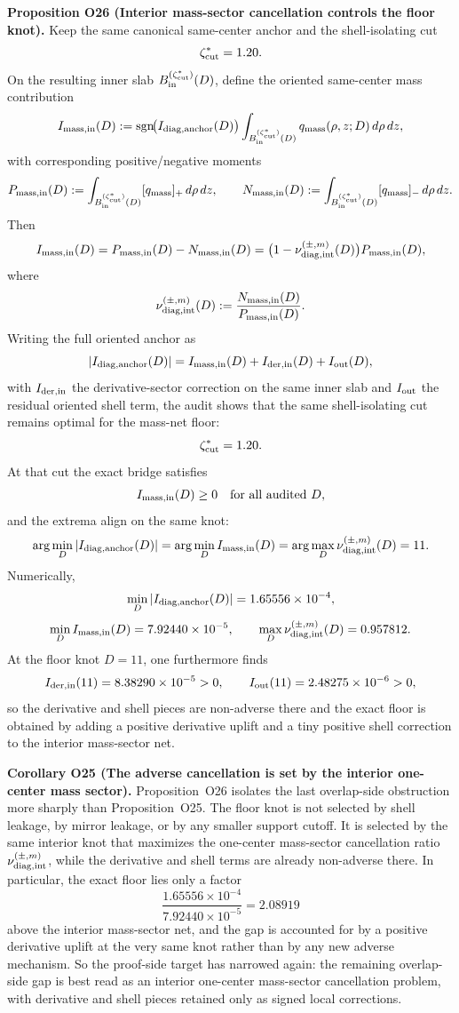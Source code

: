 \documentclass[aps,prd,onecolumn,notitlepage,nofootinbib,superscriptaddress,11pt,floatfix]{revtex4-2}
\begin{document}
\medskip\noindent\textbf{Proposition O26 (Interior mass-sector cancellation controls the floor knot).}
Keep the same canonical same-center anchor and the shell-isolating cut
\[
\zeta_{\rm cut}^{\ast}=1.20.
\]
On the resulting inner slab \(B_{\rm in}^{(\zeta_{\rm cut}^{\ast})}(D)\), define the oriented same-center mass contribution
\[
I_{\rm mass,in}(D)
:=
\operatorname{sgn}\!\bigl(I_{\rm diag,anchor}(D)\bigr)
\int_{B_{\rm in}^{(\zeta_{\rm cut}^{\ast})}(D)} q_{\rm mass}(\rho,z;D)\,d\rho\,dz,
\]
with corresponding positive/negative moments
\[
P_{\rm mass,in}(D):=\int_{B_{\rm in}^{(\zeta_{\rm cut}^{\ast})}(D)} [q_{\rm mass}]_+\,d\rho\,dz,
\qquad
N_{\rm mass,in}(D):=\int_{B_{\rm in}^{(\zeta_{\rm cut}^{\ast})}(D)} [q_{\rm mass}]_-\,d\rho\,dz.
\]
Then
\[
I_{\rm mass,in}(D)=P_{\rm mass,in}(D)-N_{\rm mass,in}(D)
=
\bigl(1-\nu_{\rm diag,int}^{(\pm,m)}(D)\bigr)P_{\rm mass,in}(D),
\]
where
\[
\nu_{\rm diag,int}^{(\pm,m)}(D)
:=
\frac{N_{\rm mass,in}(D)}{P_{\rm mass,in}(D)}.
\]
Writing the full oriented anchor as
\[
|I_{\rm diag,anchor}(D)|
=
I_{\rm mass,in}(D)+I_{\rm der,in}(D)+I_{\rm out}(D),
\]
with \(I_{\rm der,in}\) the derivative-sector correction on the same inner slab and \(I_{\rm out}\) the residual oriented shell term, the audit
shows that the same shell-isolating cut remains optimal for the mass-net floor:
\[
\zeta_{\rm cut}^{\ast}=1.20.
\]
At that cut the exact bridge satisfies
\[
I_{\rm mass,in}(D)\ge 0
\quad\text{for all audited }D,
\]
and the extrema align on the same knot:
\[
\arg\min_D |I_{\rm diag,anchor}(D)|
=
\arg\min_D I_{\rm mass,in}(D)
=
\arg\max_D \nu_{\rm diag,int}^{(\pm,m)}(D)
=
11.
\]
Numerically,
\[
\min_D |I_{\rm diag,anchor}(D)|=1.65556\times10^{-4},
\]
\[
\min_D I_{\rm mass,in}(D)=7.92440\times10^{-5},
\qquad
\max_D \nu_{\rm diag,int}^{(\pm,m)}(D)=0.957812.
\]
At the floor knot \(D=11\), one furthermore finds
\[
I_{\rm der,in}(11)=8.38290\times10^{-5}>0,
\qquad
I_{\rm out}(11)=2.48275\times10^{-6}>0,
\]
so the derivative and shell pieces are non-adverse there and the exact floor is obtained by adding a positive derivative uplift and a tiny positive shell correction to the interior mass-sector net.

\medskip\noindent\textbf{Corollary O25 (The adverse cancellation is set by the interior one-center mass sector).}
Proposition~O26 isolates the last overlap-side obstruction more sharply than Proposition~O25. The floor knot is not selected by shell leakage, by mirror leakage, or by any smaller support cutoff. It is selected by the same interior knot that maximizes the one-center mass-sector cancellation ratio
\(\nu_{\rm diag,int}^{(\pm,m)}\), while the derivative and shell terms are already non-adverse there. In particular, the exact floor lies only a factor
\[
\frac{1.65556\times10^{-4}}{7.92440\times10^{-5}}
=
2.08919
\]
above the interior mass-sector net, and the gap is accounted for by a positive derivative uplift at the very same knot rather than by any new adverse mechanism. So the proof-side target has narrowed again: the remaining overlap-side gap is best read as an interior one-center mass-sector cancellation problem, with derivative and shell pieces retained only as signed local corrections.
\end{document}
